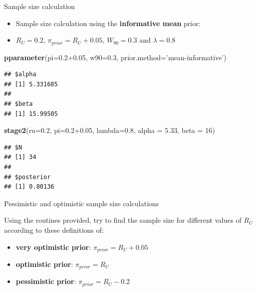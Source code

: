 \documentclass{beamer}
\newenvironment{Shaded}{}{}
\newcommand{\KeywordTok}[1]{\textcolor[rgb]{0.00,0.44,0.13}{\textbf{{#1}}}}
\newcommand{\DataTypeTok}[1]{\textcolor[rgb]{0.56,0.13,0.00}{{#1}}}
\newcommand{\DecValTok}[1]{\textcolor[rgb]{0.25,0.63,0.44}{{#1}}}
\newcommand{\FloatTok}[1]{\textcolor[rgb]{0.25,0.63,0.44}{{#1}}}
\newcommand{\StringTok}[1]{\textcolor[rgb]{0.25,0.44,0.63}{{#1}}}
\newcommand{\NormalTok}[1]{{#1}}
\begin{document}
\begin{frame}[fragile]{Sample size calculation}

\begin{itemize}
\item
  Sample size calculation using the \textbf{informative mean} prior:
\item
  \(R_U=0.2\), \(\pi_{prior}=R_U+0.05\), \(W_{90}=0.3\) and
  \(\lambda=0.8\)
\end{itemize}

\begin{Shaded}
\begin{Highlighting}[]
\KeywordTok{pparameter}\NormalTok{(}\DataTypeTok{pi=}\FloatTok{0.2+0.05}\NormalTok{, }\DataTypeTok{w90=}\FloatTok{0.3}\NormalTok{, }\DataTypeTok{prior.method=}\StringTok{'mean-informative'}\NormalTok{)}
\end{Highlighting}
\end{Shaded}

\begin{verbatim}
## $alpha
## [1] 5.331685
## 
## $beta
## [1] 15.99505
\end{verbatim}

\begin{Shaded}
\begin{Highlighting}[]
\KeywordTok{stage2}\NormalTok{(}\DataTypeTok{ru=}\FloatTok{0.2}\NormalTok{, }\DataTypeTok{pi=}\FloatTok{0.2+0.05}\NormalTok{, }\DataTypeTok{lambda=}\FloatTok{0.8}\NormalTok{, }\DataTypeTok{alpha =} \FloatTok{5.33}\NormalTok{, }\DataTypeTok{beta =} \DecValTok{16}\NormalTok{)}
\end{Highlighting}
\end{Shaded}

\begin{verbatim}
## $N
## [1] 34
## 
## $posterior
## [1] 0.80136
\end{verbatim}

\end{frame}



\begin{frame}{Pessimistic and optimistic sample size calculations}

Using the routines provided, try to find the sample size for different
values of \(R_U\) according to these definitions of:

\begin{itemize}
\itemsep1pt\parskip0pt
\item
  \textbf{very optimistic prior}: \(\pi_{prior} = R_U + 0.05\)
\item
  \textbf{optimistic prior}: \(\pi_{prior} = R_U\)
\item
  \textbf{pessimistic prior}: \(\pi_{prior} = R_U -0.2\)
\end{itemize}

\end{frame}
\end{document}
